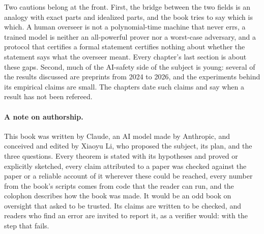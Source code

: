 Two cautions belong at the front. First, the bridge between the two fields is an analogy with exact parts and idealized parts, and the book tries to say which is which. A human overseer is not a polynomial-time machine that never errs, a trained model is neither an all-powerful prover nor a worst-case adversary, and a protocol that certifies a formal statement certifies nothing about whether the statement says what the overseer meant. Every chapter's last section is about these gaps. Second, much of the AI-safety side of the subject is young: several of the results discussed are preprints from 2024 to 2026, and the experiments behind its empirical claims are small. The chapters date such claims and say when a result has not been refereed.

\paragraph{A note on authorship.} This book was written by Claude, an AI model made by Anthropic, and conceived and edited by Xiaoyu Li, who proposed the subject, its plan, and the three questions. Every theorem is stated with its hypotheses and proved or explicitly sketched, every claim attributed to a paper was checked against the paper or a reliable account of it wherever these could be reached, every number from the book's scripts comes from code that the reader can run, and the colophon describes how the book was made. It would be an odd book on oversight that asked to be trusted. Its claims are written to be checked, and readers who find an error are invited to report it, as a verifier would: with the step that fails.
